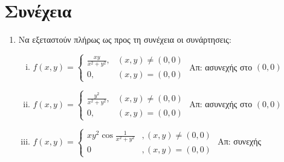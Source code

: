\begin{enumerate}
\end{enumerate}



\section*{Συνέχεια}

\begin{enumerate}
  \item Να εξεταστούν πλήρως ως προς τη συνέχεια οι συνάρτησεις:
    \begin{enumerate}[(i)]
      \item $ f(x,y) = 
        \begin{cases}
          \frac{ xy }{ x^{2} + y^{2} } ,& (x,y)\neq (0,0) \\
          0 ,& (x,y)= (0,0)
        \end{cases} $
        \hfill Απ: ασυνεχής στο $ (0,0) $ 

      \item $ f(x,y) = 
        \begin{cases} 
          \frac{y^{2}}{x^{2}+y^{2}}, & (x,y) 
          \neq (0,0) \\ 0, & (x,y) = (0,0)
        \end{cases} $
        \hfill Απ: ασυνεχής στο $ (0,0) $ 

      \item $ f(x,y)=
        \begin{cases}
          xy^{2}\cos \frac{1}{x^{2}+y^{2}} &, (x,y)\neq (0,0)\\
          0 &, (x,y)=(0,0)
        \end{cases}
        $ \hfill Απ: συνεχής
    \end{enumerate}
\end{enumerate}



